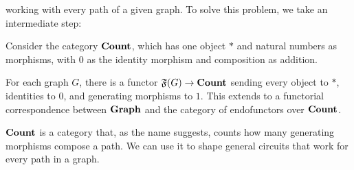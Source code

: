 \documentclass[submission,copyright,creativecommons,sharealike,noncommercial]{eptcs}
\begin{document}
working with every path of a given graph. To solve this problem, we take 
an intermediate step:
%
%
\begin{lemma}\label{lem: functor to count}
  Consider the category $\textbf{Count}$, which has one object $*$ and 
  natural numbers as morphisms, with $0$ as the identity morphism 
  and composition as addition. 

  For each graph $G$, there is a functor $\mathfrak{F}(G) \to \textbf{Count}$ sending 
  every object to  $*$, identities to $0$, and generating morphisms to $1$.
  This extends to a functorial correspondence between $\textbf{Graph}$ and the 
  category of endofunctors over $\textbf{Count}$.
\end{lemma}
%
$\textbf{Count}$ is a category that, as the name suggests, counts how many 
generating morphisms compose a path. We can use it to shape general 
circuits that work for every path in a graph.
%
%
\end{document}
